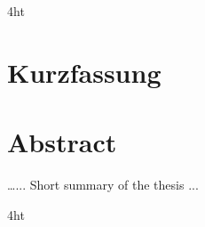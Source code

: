 \documentclass[
               paper=a4,,
               BCOR1.92mm,DIV12,headinclude, %
               bibliography=totoc,
               headsepline,
               cleardoublepage=empty,
               parskip=half,
               final   %
               ]{scrbook}
\let\ifdeutsch\iftrue
\begin{document}

\iftex4ht
\Configure{$}{\PicMath}{\EndPicMath}{} 
\fi

\VerbatimFootnotes %

\Titelblatt
\setcounter{page}{2}
\cleardoublepage

\pagestyle{preamble}
\renewcommand*{\chapterpagestyle}{preamble}

\ifdeutsch
\section*{Kurzfassung}
\else
\section*{Abstract}
\fi
\ldots ... Short summary of the thesis ...
\cleardoublepage

\iftex4ht
\else
{}
\fi

%
%

\tableofcontents

\end{document}
